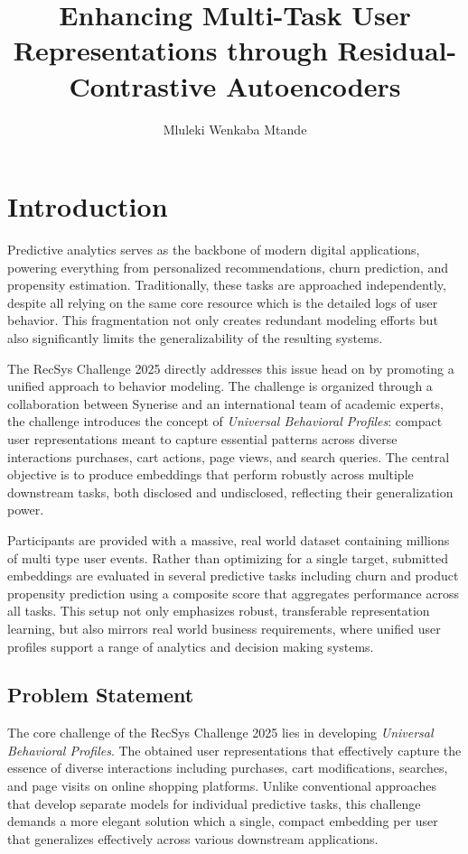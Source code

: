 \documentclass[sigconf]{acmart}
\title{Enhancing Multi-Task User Representations through Residual-Contrastive Autoencoders}
\author{Mluleki Wenkaba Mtande}
\affiliation{
  \institution{Independent Researcher}
  \city{Taichung}
  \country{Taiwan}
}
\begin{document}
\maketitle

\section{Introduction}
Predictive analytics serves as the backbone of modern digital applications, powering everything from personalized recommendations, churn prediction, and propensity estimation. Traditionally, these tasks are approached independently, despite all relying on the same core resource which is the detailed logs of user behavior. This fragmentation not only creates redundant modeling efforts but also significantly limits the generalizability of the resulting systems.

The RecSys Challenge 2025 \cite{recsys2025} directly addresses this issue head on by promoting a unified approach to behavior modeling.  The challenge is organized through a collaboration between Synerise and an international team of academic experts, the challenge introduces the concept of \emph{Universal Behavioral Profiles}: compact user representations meant to capture essential patterns across diverse interactions purchases, cart actions, page views, and search queries. The central objective is to produce embeddings that perform robustly across multiple downstream tasks, both disclosed and undisclosed, reflecting their generalization power.

Participants are provided with a massive, real world dataset containing millions of multi type user events. Rather than optimizing for a single target, submitted embeddings are evaluated in several predictive tasks including churn and product propensity prediction using a composite score that aggregates performance across all tasks. This setup not only emphasizes robust, transferable representation learning, but also mirrors real world business requirements, where unified user profiles support a range of analytics and decision making systems.


\subsection{Problem Statement}
The core challenge of the RecSys Challenge 2025 lies in developing \emph{Universal Behavioral Profiles}. The obtained user representations that effectively capture the essence of diverse interactions including purchases, cart modifications, searches, and page visits on online shopping platforms. Unlike conventional approaches that develop separate models for individual predictive tasks, this challenge demands a more elegant solution which  a single, compact embedding per user that generalizes effectively across various downstream applications.
\end{document}
